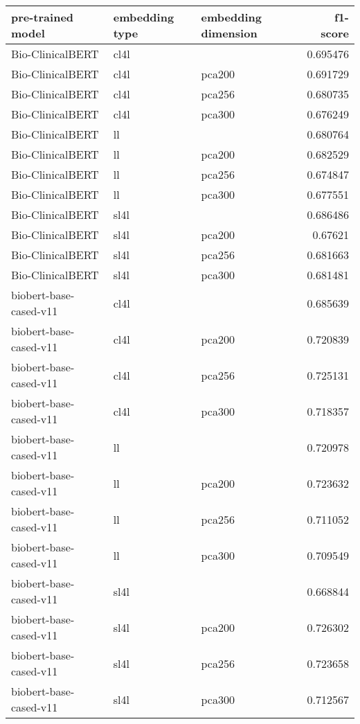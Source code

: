 \begin{tabular}{lllr}
\hline
 pre-trained model      & embedding type   & embedding dimension   &   f1-score \\
\hline
 Bio-ClinicalBERT       & cl4l             &                       &   0.695476 \\
 Bio-ClinicalBERT       & cl4l             & pca200                &   0.691729 \\
 Bio-ClinicalBERT       & cl4l             & pca256                &   0.680735 \\
 Bio-ClinicalBERT       & cl4l             & pca300                &   0.676249 \\
 Bio-ClinicalBERT       & ll               &                       &   0.680764 \\
 Bio-ClinicalBERT       & ll               & pca200                &   0.682529 \\
 Bio-ClinicalBERT       & ll               & pca256                &   0.674847 \\
 Bio-ClinicalBERT       & ll               & pca300                &   0.677551 \\
 Bio-ClinicalBERT       & sl4l             &                       &   0.686486 \\
 Bio-ClinicalBERT       & sl4l             & pca200                &   0.67621  \\
 Bio-ClinicalBERT       & sl4l             & pca256                &   0.681663 \\
 Bio-ClinicalBERT       & sl4l             & pca300                &   0.681481 \\
 biobert-base-cased-v11 & cl4l             &                       &   0.685639 \\
 biobert-base-cased-v11 & cl4l             & pca200                &   0.720839 \\
 biobert-base-cased-v11 & cl4l             & pca256                &   0.725131 \\
 biobert-base-cased-v11 & cl4l             & pca300                &   0.718357 \\
 biobert-base-cased-v11 & ll               &                       &   0.720978 \\
 biobert-base-cased-v11 & ll               & pca200                &   0.723632 \\
 biobert-base-cased-v11 & ll               & pca256                &   0.711052 \\
 biobert-base-cased-v11 & ll               & pca300                &   0.709549 \\
 biobert-base-cased-v11 & sl4l             &                       &   0.668844 \\
 biobert-base-cased-v11 & sl4l             & pca200                &   0.726302 \\
 biobert-base-cased-v11 & sl4l             & pca256                &   0.723658 \\
 biobert-base-cased-v11 & sl4l             & pca300                &   0.712567 \\
\hline
\end{tabular}